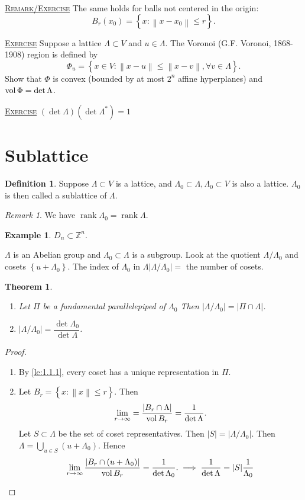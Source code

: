 \documentclass{report}
\newcommand{\Z}{\mathbb{Z}}
\newcommand{\norm}[1]{\left\| #1 \right\|}
\newcommand{\set}[1]{\left\{ #1 \right\}}
\newcommand{\rank}{\operatorname{rank}}
\newcommand{\fancyem}[1]{\underline{\textsc{#1}}}
\newtheorem{theorem}{Theorem}[section]
\theoremstyle{definition}
\newtheorem{definition}{Definition}[section]
\newtheorem{example}{Example}[section]
\theoremstyle{remark}
\newtheorem*{remark}{Remark}
\numberwithin{equation}{section}
\begin{document}
\fancyem{Remark/Exercise} The same holds for balls not centered in the origin: \[B_{r}(x_0) = \set{x: \norm{x - x_0} \leq r}.\]

\fancyem{Exercise} Suppose a lattice $\Lambda \subset V$ and $u \in \Lambda$. The Voronoi (G.F. Voronoi, 1868-1908) region is defined by \[
\Phi_{u} = \set{x \in V: \norm{x - u} \leq \norm{x-v}, \forall v \in \Lambda}.  
\]
Show that $\Phi$ is convex (bounded by at most $2^n$ affine hyperplanes) and $\operatorname{vol} \Phi = \det \Lambda$.

\fancyem{Exercise} $(\det \Lambda)(\det \Lambda^*) = 1$

\section{Sublattice}
\begin{definition}
    Suppose $\Lambda \subset V$ is a lattice, and $\Lambda_0 \subset \Lambda, \Lambda_0 \subset V$ is also a lattice. $\Lambda_0$ is then called a sublattice of $\Lambda$.
\end{definition}
\begin{remark}
    We have $\rank \Lambda_0 = \rank \Lambda$.
\end{remark}
\begin{example}
    $D_n \subset \Z^n$.
\end{example}
$\Lambda$ is an Abelian group and $\Lambda_0 \subset \Lambda$ is a subgroup. Look at the quotient $\Lambda/\Lambda_0$ and cosets $\set{u + \Lambda_0}$. The index of $\Lambda_0$ in $\Lambda |\Lambda / \Lambda_0| = $ the number of cosets.

\begin{theorem}
    \begin{enumerate}
        \item Let $\Pi$ be a fundamental parallelepiped of $\Lambda_0$ Then $|\Lambda / \Lambda_0| = |\Pi \cap \Lambda|$.
        \item $|\Lambda /\Lambda_0| = \dfrac{\det \Lambda_0}{\det \Lambda}$.
    \end{enumerate}
\end{theorem}
\begin{proof}
    \begin{enumerate}
        \item By \autoref{le:1.1.1}, every coset has a unique representation in $\Pi$.
        \item Let $B_r = \set{x: \norm{x} \leq r}$. Then \[\lim_{r \to \infty} = \frac{|B_r \cap \Lambda|}{\operatorname{vol} B_r} = \frac{1}{\det \Lambda}.\]
        Let $S \subset \Lambda$ be the set of coset representatives. Then $|S| = |\Lambda/\Lambda_0|.$ Then $\Lambda = \bigcup_{u \in S} (u + \Lambda_0)$. Hence \[\lim_{r \to \infty} \frac{|B_r \cap (u + \Lambda_0)|}{\operatorname{vol} B_r} = \frac{1}{\det \Lambda_0}. \implies \frac{1}{\det \Lambda} = |S|\frac{1}{\Lambda_0}\qedhere\]
    \end{enumerate}
\end{proof}
\end{document}

